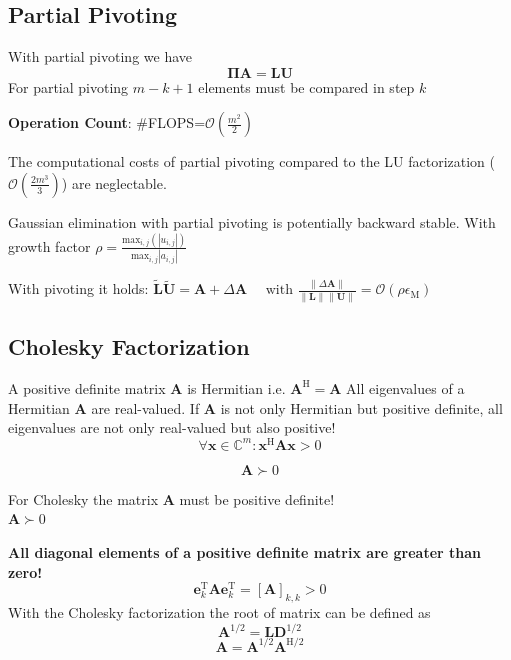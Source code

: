 \documentclass[english]{latex4ei/latex4ei_sheet}
\begin{document}
\begin{sectionbox}
    \subsection{Partial Pivoting}
    With partial pivoting we have
    $$\mathbf{\Pi}\mathbf{A} = \mathbf{L}\mathbf{U}$$
    For partial pivoting $m-k+1$ elements must be compared in step $k$
    \begin{emphbox}
        \large \textbf{Operation Count}: \#FLOPS=$\mathcal{O}(\frac{m^2}{2})$\\
    \end{emphbox}
    The computational costs of partial pivoting compared to the LU factorization ($\mathcal{O}(\frac{2m^3}{3})$) are neglectable.
    \begin{emphbox}
        \large Gaussian elimination with partial pivoting is potentially backward stable. With growth factor $\rho=\frac{\text{max}_{i,j}(|u_{i,j}|)}{\text{max}_{i,j} |a_{i,j}|}$
    \end{emphbox}
    With pivoting it holds:
    $\tilde{\mathbf{L}}\tilde{\mathbf{U}} = \mathbf{A} + \Delta\mathbf{A}\quad \text{ with } \frac{\parallel \Delta \mathbf{A} \parallel}{\parallel\mathbf{L}\parallel\parallel\mathbf{U}\parallel} = \mathcal{O}(\rho \epsilon_\text{M})$
\end{sectionbox}
\begin{sectionbox}
    \subsection{Cholesky Factorization}
    A positive definite matrix $\mathbf{A}$ is Hermitian i.e. $\mathbf{A}^\text{H} = \mathbf{A}$
    All eigenvalues of a Hermitian $\mathbf{A}$ are real-valued. If $\mathbf{A}$ is not only Hermitian but positive definite, all eigenvalues are not only real-valued but also positive!
    $$\forall \mathbf{x}\in\mathbb{C}^{m}: \mathbf{x}^\text{H}\mathbf{A}\mathbf{x} > 0$$

    $$\mathbf{A} \succ 0$$

    \begin{emphbox}
        \large For Cholesky the matrix $\mathbf{A}$ must be positive definite!\\ $\mathbf{A} \succ 0$
    \end{emphbox}
    \textbf{All diagonal elements of a positive definite matrix are greater than zero!}
    $$\mathbf{e}^\text{T}_k \mathbf{A}\mathbf{e}^\text{T}_k = [\mathbf{A}]_{k,k} > 0$$
    With the Cholesky factorization the root of matrix can be defined as
    $$\mathbf{A}^{1/2} = \mathbf{L}\mathbf{D}^{1/2}$$
    $$\mathbf{A} = \mathbf{A}^{1/2}\mathbf{A}^{\text{H}/2}$$

\end{sectionbox}
\end{document}
